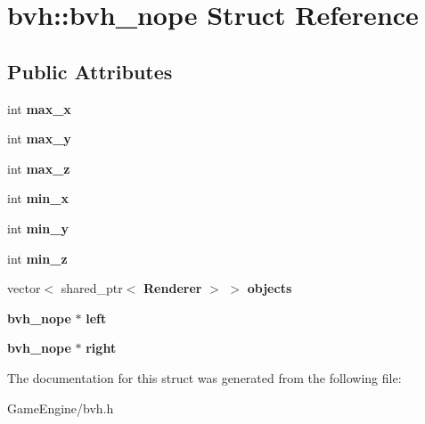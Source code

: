 \section{bvh\+::bvh\+\_\+nope Struct Reference}
\label{structbvh_1_1bvh__nope}
\subsection*{Public Attributes}
\begin{DoxyCompactItemize}
\item 
\mbox{\label{structbvh_1_1bvh__nope_a9b0490bad83eec902c9003629a89add9}} 
int {\bfseries max\+\_\+x}
\item 
\mbox{\label{structbvh_1_1bvh__nope_a0bac16c0914987f39cb661ac4b65f04f}} 
int {\bfseries max\+\_\+y}
\item 
\mbox{\label{structbvh_1_1bvh__nope_a812ca7831629f741e044d9d904c5aabe}} 
int {\bfseries max\+\_\+z}
\item 
\mbox{\label{structbvh_1_1bvh__nope_a2817909d73476731e6986e23fd0c02e5}} 
int {\bfseries min\+\_\+x}
\item 
\mbox{\label{structbvh_1_1bvh__nope_a2375b18a9142273e9fcbc6a993708619}} 
int {\bfseries min\+\_\+y}
\item 
\mbox{\label{structbvh_1_1bvh__nope_aa8f28ecf3473e19202aaaa7be68ae90c}} 
int {\bfseries min\+\_\+z}
\item 
\mbox{\label{structbvh_1_1bvh__nope_a0769eca0f783463bd47d68404b18046b}} 
vector$<$ shared\+\_\+ptr$<$ \textbf{ Renderer} $>$ $>$ {\bfseries objects}
\item 
\mbox{\label{structbvh_1_1bvh__nope_a1fb6e323a76d29fe91561d9838e6127f}} 
\textbf{ bvh\+\_\+nope} $\ast$ {\bfseries left}
\item 
\mbox{\label{structbvh_1_1bvh__nope_ac1331414ee6214f6fa9ab2168a720516}} 
\textbf{ bvh\+\_\+nope} $\ast$ {\bfseries right}
\end{DoxyCompactItemize}


The documentation for this struct was generated from the following file\+:\begin{DoxyCompactItemize}
\item 
Game\+Engine/bvh.\+h\end{DoxyCompactItemize}
